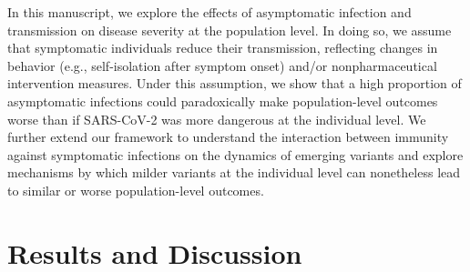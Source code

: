 \documentclass[12pt]{article}
\begin{document}
In this manuscript, we explore the effects of asymptomatic infection and transmission on disease severity at the population level.
In doing so, we assume that symptomatic individuals reduce their transmission, reflecting changes in behavior (e.g., self-isolation after symptom onset) and/or nonpharmaceutical intervention measures.
Under this assumption, we show that a high proportion of asymptomatic infections could paradoxically make population-level outcomes worse than if SARS-CoV-2 was more dangerous at the individual level.
We further extend our framework to understand the interaction between immunity against symptomatic infections on the dynamics of emerging variants and explore mechanisms by which milder variants at the individual level can nonetheless lead to similar or worse population-level outcomes.

\section*{Results and Discussion}
\end{document}
